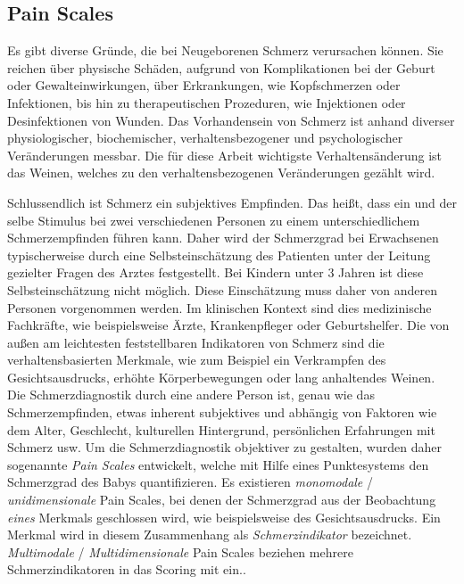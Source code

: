 \subsection{Pain Scales}
\label{sec:painScores}

Es gibt diverse Gründe, die bei Neugeborenen Schmerz verursachen können. Sie reichen über physische Schäden, aufgrund von Komplikationen bei der Geburt oder Gewalteinwirkungen, über Erkrankungen, wie Kopfschmerzen oder Infektionen, bis hin zu therapeutischen Prozeduren, wie Injektionen oder Desinfektionen von Wunden. Das Vorhandensein von Schmerz ist anhand diverser physiologischer, biochemischer, verhaltensbezogener und psychologischer Veränderungen messbar. Die für diese Arbeit wichtigste Verhaltensänderung ist das Weinen, welches zu den verhaltensbezogenen Veränderungen gezählt wird.\cite[S. 441]{PainAssessment01} 

Schlussendlich ist Schmerz ein subjektives Empfinden. Das heißt, dass ein und der selbe Stimulus bei zwei verschiedenen Personen zu einem unterschiedlichem Schmerzempfinden führen kann. Daher wird der Schmerzgrad bei Erwachsenen typischerweise durch eine Selbsteinschätzung des Patienten unter der Leitung gezielter Fragen des Arztes festgestellt. Bei Kindern unter 3 Jahren ist diese Selbsteinschätzung nicht möglich. Diese Einschätzung muss daher von anderen Personen vorgenommen werden. Im klinischen Kontext sind dies medizinische Fachkräfte, wie beispielsweise Ärzte, Krankenpfleger oder Geburtshelfer. Die von außen am leichtesten feststellbaren Indikatoren von Schmerz sind die verhaltensbasierten Merkmale, wie zum Beispiel ein Verkrampfen des Gesichtsausdrucks, erhöhte Körperbewegungen oder lang anhaltendes Weinen.\cite[S. 438]{PainAssessment01} Die Schmerzdiagnostik durch eine andere Person ist, genau wie das Schmerzempfinden, etwas inherent subjektives und abhängig von Faktoren wie dem Alter, Geschlecht, kulturellen Hintergrund, persönlichen Erfahrungen mit Schmerz usw.\cite[S. 3]{overview} Um die Schmerzdiagnostik objektiver zu gestalten, wurden daher sogenannte \emph{Pain Scales} entwickelt, welche mit Hilfe eines Punktesystems den Schmerzgrad des Babys quantifizieren.\cite[S. 438 - 439]{PainAssessment01} Es existieren \emph{monomodale} / \emph{unidimensionale} Pain Scales, bei denen der Schmerzgrad aus der Beobachtung \emph{eines} Merkmals geschlossen wird, wie beispielsweise des Gesichtsausdrucks. Ein Merkmal wird in diesem Zusammenhang als \emph{Schmerzindikator} bezeichnet. \emph{ Multimodale} / \emph{Multidimensionale} Pain Scales beziehen mehrere Schmerzindikatoren in das Scoring mit ein.\cite[S. 69 - 71]{PainAssessment02}. 

